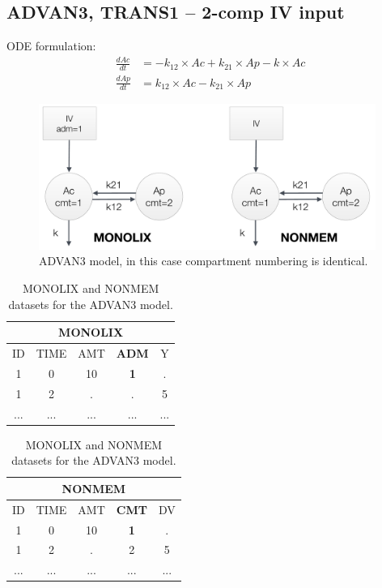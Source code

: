 \subsection{ADVAN3, TRANS1 -- 2-comp IV input}
ODE formulation:
\begin{align}
\frac{dAc}{dt} &= -k_{12}\times Ac + k_{21} \times Ap - k \times Ac  \nonumber \\
\frac{dAp}{dt} &= k_{12}\times Ac - k_{21} \times Ap  \nonumber
\end{align}

\begin{figure}[htbp!]
\centering
 \includegraphics[width=110mm]{pics/Advan3}
\caption{ADVAN3 model, in this case compartment numbering is identical.}
\label{fig:Advan3}
\end{figure}


\begin{table}[ht!]
\footnotesize
\parbox{.5\linewidth}{
\centering
\begin{tabular}{ccccc}
  \hline
   \multicolumn{5}{c}{\textbf{MONOLIX}} \\
  \hline
ID & TIME & AMT & \textbf{ADM} & Y \\
  \hline
1  & 0        & 10   & \textbf{1} & .       \\
1  & 2        & .      & .    & 5    \\
... &  ...      &  ...   &  ... & ...    \\
\end{tabular}
}
\hfill
\parbox{.5\linewidth}{
\centering
\begin{tabular}{ccccc}
  \hline
   \multicolumn{5}{c}{\textbf{NONMEM}} \\
  \hline
ID & TIME & AMT & \textbf{CMT} & DV \\
  \hline
1  & 0        & 10   & \textbf{1}   & .    \\
1  & 2        & .      & 2    & 5   \\
... &  ...      &  ...   &  ... & ...  \\
\end{tabular}
}
\caption{MONOLIX and NONMEM datasets for the ADVAN3 model.}
\end{table}


